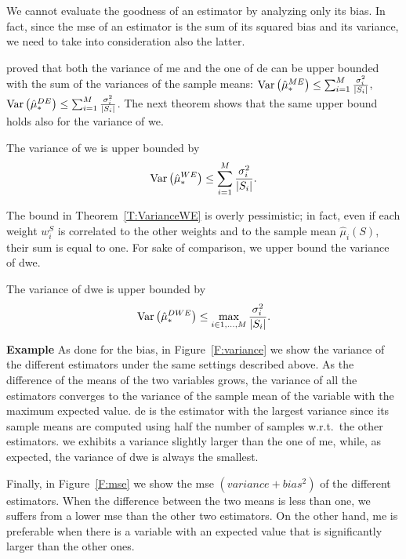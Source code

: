 We cannot evaluate the goodness of an estimator by analyzing only its bias.
In fact, since the \gls{mse} of an estimator is the sum of its squared bias and its variance, we need to take into consideration also the latter.

\cite{van2013estimating} proved that both the variance of \gls{me} and the one of \gls{de} can be upper bounded with the sum of the variances of the sample means:
$ \mathrm{Var}\left(\hat\mu_*^{ME}\right) \leq \sum_{i=1}^M \frac{\sigma^2_i}{|S_i|}$, $\mathrm{Var}\left(\hat\mu_*^{DE}\right) \leq \sum_{i=1}^M \frac{\sigma^2_i}{|S_i|}$.
The next theorem shows that the same upper bound holds also for the variance of \gls{we}.
\begin{theorem}\label{T:VarianceWE}
 The variance of \gls{we} is upper bounded by
 $$\mathrm{Var}\left(\hat\mu_*^{WE}\right) \leq \sum_{i=1}^M \frac{\sigma^2_i}{|S_i|}.$$
\end{theorem}
The bound in Theorem~\ref{T:VarianceWE} is overly pessimistic; in fact, even if each weight $w_i^S$ is correlated to the other weights and to the sample mean $\hat\mu_i(S)$, their sum is equal to one.
For sake of comparison, we upper bound the variance of \gls{dwe}.
\begin{theorem}\label{T:VarianceOWE}
 The variance of \gls{dwe} is upper bounded by
 $$\mathrm{Var}\left(\hat\mu_*^{DWE}\right) \leq \max_{i\in{1,\dots,M}} \frac{\sigma^2_i}{|S_i|}.$$
\end{theorem}

\textbf{Example} As done for the bias, in Figure~\ref{F:variance} we show the variance of the different estimators under the same settings described above.
As the difference of the means of the two variables grows, the variance of all the estimators converges to the variance of the sample mean of the variable with the maximum expected value.
\gls{de} is the estimator with the largest variance since its sample means are computed using half the number of samples w.r.t.~the other estimators.
\gls{we} exhibits a variance slightly larger than the one of \gls{me}, while, as expected, the variance of \gls{dwe} is always the smallest.

Finally, in Figure~\ref{F:mse} we show the \gls{mse} $(variance + bias^2)$ of the different estimators.
When the difference between the two means is less than one, \gls{we} suffers from a lower \gls{mse} than the other two estimators.
On the other hand, \gls{me} is preferable when there is a variable with an expected value that is significantly larger than the other ones.

